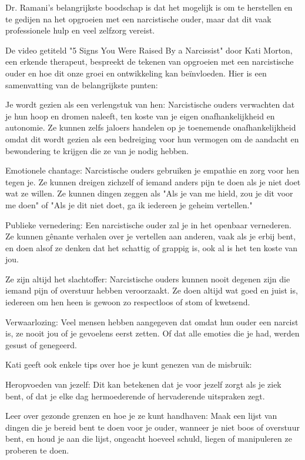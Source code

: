 Dr. Ramani's belangrijkste boodschap is dat het mogelijk is om te herstellen en te gedijen na het opgroeien met een narcistische ouder, maar dat dit vaak professionele hulp en veel zelfzorg vereist.

De video getiteld "5 Signs You Were Raised By a Narcissist" door Kati Morton, een erkende therapeut, bespreekt de tekenen van opgroeien met een narcistische ouder en hoe dit onze groei en ontwikkeling kan beïnvloeden. Hier is een samenvatting van de belangrijkste punten:

Je wordt gezien als een verlengstuk van hen: Narcistische ouders verwachten dat je hun hoop en dromen naleeft, ten koste van je eigen onafhankelijkheid en autonomie. Ze kunnen zelfs jaloers handelen op je toenemende onafhankelijkheid omdat dit wordt gezien als een bedreiging voor hun vermogen om de aandacht en bewondering te krijgen die ze van je nodig hebben.

Emotionele chantage: Narcistische ouders gebruiken je empathie en zorg voor hen tegen je. Ze kunnen dreigen zichzelf of iemand anders pijn te doen als je niet doet wat ze willen. Ze kunnen dingen zeggen als "Als je van me hield, zou je dit voor me doen" of "Als je dit niet doet, ga ik iedereen je geheim vertellen."

Publieke vernedering: Een narcistische ouder zal je in het openbaar vernederen. Ze kunnen gênante verhalen over je vertellen aan anderen, vaak als je erbij bent, en doen alsof ze denken dat het schattig of grappig is, ook al is het ten koste van jou.

Ze zijn altijd het slachtoffer: Narcistische ouders kunnen nooit degenen zijn die iemand pijn of overstuur hebben veroorzaakt. Ze doen altijd wat goed en juist is, iedereen om hen heen is gewoon zo respectloos of stom of kwetsend.

Verwaarlozing: Veel mensen hebben aangegeven dat omdat hun ouder een narcist is, ze nooit jou of je gevoelens eerst zetten. Of dat alle emoties die je had, werden gesust of genegeerd.

Kati geeft ook enkele tips over hoe je kunt genezen van de misbruik:

Heropvoeden van jezelf: Dit kan betekenen dat je voor jezelf zorgt als je ziek bent, of dat je elke dag hermoederende of hervaderende uitspraken zegt.

Leer over gezonde grenzen en hoe je ze kunt handhaven: Maak een lijst van dingen die je bereid bent te doen voor je ouder, wanneer je niet boos of overstuur bent, en houd je aan die lijst, ongeacht hoeveel schuld, liegen of manipuleren ze proberen te doen.


